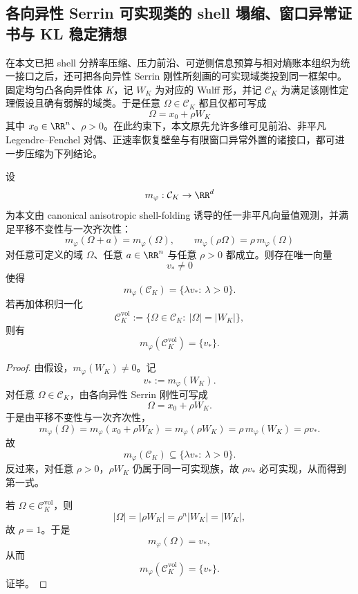 \subsection{各向异性 Serrin 可实现类的 shell 塌缩、窗口异常证书与 KL 稳定猜想}\label{subsec:conclusion-anisotropic-serrin-shell-collapse-window-certificate-kl}
在本文已把 shell 分辨率压缩、压力前沿、可逆侧信息预算与相对熵账本组织为统一接口之后，还可把各向异性 Serrin 刚性所刻画的可实现域类投到同一框架中。固定均匀凸各向异性体 \(K\)，记 \(W_K\) 为对应的 Wulff 形，并记 \(\mathcal C_K\) 为满足该刚性定理假设且确有弱解的域类。于是任意 \(\Omega\in\mathcal C_K\) 都且仅都可写成
\[
\Omega=x_0+\rho W_K
\]
其中 \(x_0\in\RR^n\)、\(\rho>0\)。在此约束下，本文原先允许多维可见前沿、非平凡 Legendre--Fenchel 对偶、正速率恢复壁垒与有限窗口异常外置的诸接口，都可进一步压缩为下列结论。

\begin{theorem}\label{thm:conclusion-serrin-realizable-mean-cone-collapse}
设
\[
m_\varphi:\mathcal C_K\to\RR^d
\]
为本文由 canonical anisotropic shell-folding 诱导的任一非平凡向量值观测，并满足平移不变性与一次齐次性：
\[
m_\varphi(\Omega+a)=m_\varphi(\Omega),
\qquad
m_\varphi(\rho\Omega)=\rho\,m_\varphi(\Omega)
\]
对任意可定义的域 \(\Omega\)、任意 \(a\in\RR^n\) 与任意 \(\rho>0\) 都成立。则存在唯一向量
\[
v_\ast\neq 0
\]
使得
\[
m_\varphi(\mathcal C_K)=\{\lambda v_\ast:\ \lambda>0\}.
\]
若再加体积归一化
\[
\mathcal C_K^{\mathrm{vol}}:=\{\Omega\in\mathcal C_K:\ |\Omega|=|W_K|\},
\]
则有
\[
m_\varphi(\mathcal C_K^{\mathrm{vol}})=\{v_\ast\}.
\]
\end{theorem}
\begin{proof}
由假设，\(m_\varphi(W_K)\neq 0\)。记
\[
v_\ast:=m_\varphi(W_K).
\]
对任意 \(\Omega\in\mathcal C_K\)，由各向异性 Serrin 刚性可写成
\[
\Omega=x_0+\rho W_K.
\]
于是由平移不变性与一次齐次性，
\[
m_\varphi(\Omega)=m_\varphi(x_0+\rho W_K)=m_\varphi(\rho W_K)=\rho\,m_\varphi(W_K)=\rho v_\ast.
\]
故
\[
m_\varphi(\mathcal C_K)\subseteq \{\lambda v_\ast:\ \lambda>0\}.
\]
反过来，对任意 \(\rho>0\)，\(\rho W_K\) 仍属于同一可实现族，故 \(\rho v_\ast\) 必可实现，从而得到第一式。

若 \(\Omega\in\mathcal C_K^{\mathrm{vol}}\)，则
\[
|\Omega|=|\rho W_K|=\rho^n|W_K|=|W_K|,
\]
故 \(\rho=1\)。于是
\[
m_\varphi(\Omega)=v_\ast,
\]
从而
\[
m_\varphi(\mathcal C_K^{\mathrm{vol}})=\{v_\ast\}.
\]
证毕。
\end{proof}

